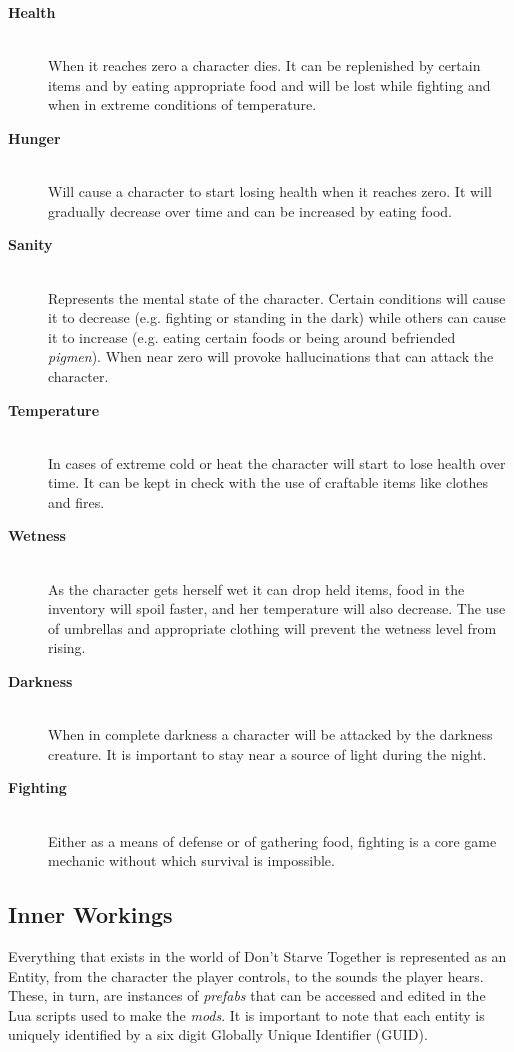 \begin{description}
	\item[\textbf{Health}] \hfill \\ When it reaches zero a character dies. It can be replenished by certain items and by eating appropriate food and will be lost while fighting and when in extreme conditions of temperature.
	\item[\textbf{Hunger}] \hfill \\ Will cause a character to start losing health when it reaches zero. It will gradually decrease over time and can be increased by eating food.
    \item[\textbf{Sanity}] \hfill \\ Represents the mental state of the character. Certain conditions will cause it to decrease (e.g. fighting or standing in the dark) while others can cause it to increase (e.g. eating certain foods or being around befriended \textit{pigmen}). When near zero will provoke hallucinations that can attack the character. 
	\item[\textbf{Temperature}] \hfill \\ In cases of extreme cold or heat the character will start to lose health over time. It can be kept in check with the use of craftable items like clothes and fires.
	\item[\textbf{Wetness}] \hfill \\ As the character gets herself wet it can drop held items, food in the inventory will spoil faster, and her temperature will also decrease. The use of umbrellas and appropriate clothing will prevent the wetness level from rising.
    \item[\textbf{Darkness}] \hfill \\ When in complete darkness a character will be attacked by the darkness creature. It is important to stay near a source of light during the night.
    \item[\textbf{Fighting}] \hfill \\ Either as a means of defense or of gathering food, fighting is a core game mechanic without which survival is impossible.
\end{description}

\subsection{Inner Workings}

Everything that exists in the world of Don't Starve Together is represented as an Entity, from the character the player controls, to the sounds the player hears.
These, in turn, are instances of \textit{prefabs} that can be accessed and edited in the Lua scripts used to make the \textit{mods}.
It is important to note that each entity is uniquely identified by a six digit Globally Unique Identifier (GUID).

